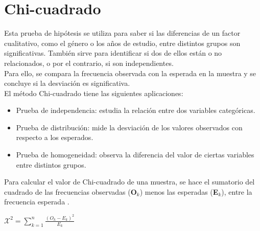 
\section{Chi-cuadrado}
Esta prueba de hipótesis se utiliza para saber si las diferencias de un factor cualitativo, como el género o los años de estudio, entre distintos grupos son significativas. También sirve para identificar si dos de ellos están o no relacionados, o por el contrario, si son independientes.\\

Para ello, se compara la frecuencia observada con la esperada en la muestra y se concluye si la desviación es significativa.\\

El método Chi-cuadrado tiene las siguientes aplicaciones:
\begin{itemize}
	\item Prueba de independencia: estudia la relación entre dos variables categóricas.
	\item Prueba de distribución: mide la desviación de los valores observados con respecto a los esperados.
	\item Prueba de homogeneidad: observa la diferencia del valor de ciertas variables entre distintos grupos.
\end{itemize}

Para calcular el valor de Chi-cuadrado de una muestra, se hace el sumatorio del cuadrado de las frecuencias observadas (\textbf{O$_{k}$}) menos las esperadas (\textbf{E$_{k}$}), entre la frecuencia esperada \cite{saldana2011prueba}.
\begin{center}
	$\mathcal{X}^{2} = \sum_{k=1}^{n}\frac{(O_{k}-E_{k})^{2}}{E_{k}}$
\end{center}


 



